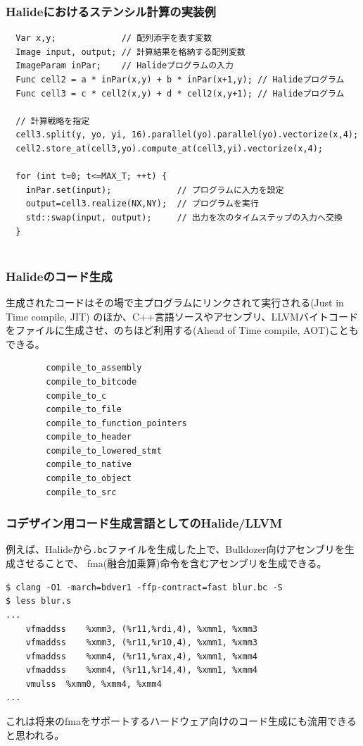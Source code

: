 \documentclass[dvipdfmx,cjk]{beamer}
\begin{document}
\begin{frame}[fragile]\frametitle{Halideにおけるステンシル計算の実装例}

\begingroup
    \fontsize{9pt}{10pt}\selectfont
\begin{verbatim}
  Var x,y;             // 配列添字を表す変数
  Image input, output; // 計算結果を格納する配列変数
  ImageParam inPar;    // Halideプログラムの入力
  Func cell2 = a * inPar(x,y) + b * inPar(x+1,y); // Halideプログラム
  Func cell3 = c * cell2(x,y) + d * cell2(x,y+1); // Halideプログラム

  // 計算戦略を指定
  cell3.split(y, yo, yi, 16).parallel(yo).parallel(yo).vectorize(x,4);
  cell2.store_at(cell3,yo).compute_at(cell3,yi).vectorize(x,4);

  for (int t=0; t<=MAX_T; ++t) {
    inPar.set(input);             // プログラムに入力を設定
    output=cell3.realize(NX,NY);  // プログラムを実行
    std::swap(input, output);     // 出力を次のタイムステップの入力へ交換
  }


\end{verbatim}
\endgroup


\end{frame}


\begin{frame}[fragile]\frametitle{Halideのコード生成}

生成されたコードはその場で主プログラムにリンクされて実行される(Just in Time compile, JIT)
のほか、C++言語ソースやアセンブリ、LLVMバイトコードをファイルに生成させ、のちほど利用する(Ahead of Time compile, AOT)こともできる。

\begingroup
    \fontsize{9pt}{10pt}\selectfont
\begin{verbatim}
        compile_to_assembly
        compile_to_bitcode
        compile_to_c
        compile_to_file
        compile_to_function_pointers
        compile_to_header
        compile_to_lowered_stmt
        compile_to_native
        compile_to_object
        compile_to_src
\end{verbatim}
\endgroup

\end{frame}


\begin{frame}[fragile]\frametitle{コデザイン用コード生成言語としてのHalide/LLVM}

例えば、Halideから{\tt .bc}ファイルを生成した上で、Bulldozer向けアセンブリを生成させることで、
fma(融合加乗算)命令を含むアセンブリを生成できる。

\begingroup
    \fontsize{8pt}{9pt}\selectfont
\begin{verbatim}
$ clang -O1 -march=bdver1 -ffp-contract=fast blur.bc -S
$ less blur.s
...
	vfmaddss	%xmm3, (%r11,%rdi,4), %xmm1, %xmm3
	vfmaddss	%xmm3, (%r11,%r10,4), %xmm1, %xmm3
	vfmaddss	%xmm4, (%r11,%rax,4), %xmm1, %xmm4
	vfmaddss	%xmm4, (%r11,%r14,4), %xmm1, %xmm4
	vmulss	%xmm0, %xmm4, %xmm4
...
\end{verbatim}
\endgroup

これは将来のfmaをサポートするハードウェア向けのコード生成にも流用できると思われる。


\end{frame}
\end{document}
